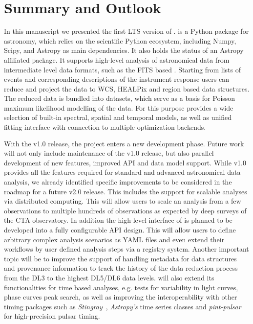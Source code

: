\documentclass[longauth]{aa}
\begin{document}
\section{Summary and Outlook}
\label{sec:summary-and-outlook}
%
In this manuscript we presented the first LTS version of \gammapy.
\gammapy is a Python package for \gammaray astronomy, which relies on the
scientific Python ecosystem, including Numpy, Scipy, and Astropy as
main dependencies. It also holds the status of an Astropy affiliated
package. It supports high-level analysis of astronomical \gammaray
data from intermediate level data formats, such as the FITS based
\gadf. Starting from lists of \gammaray events and corresponding descriptions
of the instrument response users can reduce and project the data
to WCS, HEALPix and region based data structures. The reduced data is bundled
into datasets, which serve as a basis for Poisson maximum likelihood
modelling of the data. For this purpose \gammapy provides a wide selection
of built-in spectral, spatial and temporal models, as well as unified
fitting interface with connection to multiple optimization backends.

With the v1.0 release, the \gammapy project enters a new development
phase. Future work will not only include maintenance of the v1.0 release,
but also parallel development of new features, improved API and data
model support. While v1.0 provides all the features required for
standard and advanced astronomical \gammaray data analysis,
we already identified specific improvements to be considered in the
roadmap for a future v2.0 release. This includes the support for
scalable analyses via distributed computing. This will allow
users to scale an analysis from a few observations to multiple
hundreds of observations as expected by deep surveys of the CTA
observatory. In addition the high-level interface
of \gammapy is planned to be developed into a fully configurable
API design. This will allow users to define arbitrary complex analysis
scenarios as YAML files and even extend their workflows by user defined
analysis steps via a registry system. Another important topic will
be to improve the support of handling metadata for data structures
and provenance information to track the history of the data reduction
process from the DL3 to the highest DL5/DL6 data levels. \gammapy will
also extend its functionalities for time based analyses,
e.g. tests for variability in light curves, phase curves peak search, 
as well as improving the interoperability with other timing packages such
as \textit{Stingray}~\citep{Stingray2019}, \textit{Astropy's}
time series classes and \textit{pint-pulsar}~\citep{Luo2021}
 for high-precision pulsar timing.
\end{document}
